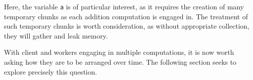 Here, the variable \texttt{a} is of particular interest, as it requires
the creation of many temporary chunks as each addition computation is
engaged in. The treatment of such temporary chunks is worth
consideration, as without appropriate collection, they will gather and
leak memory.

With client and workers engaging in multiple computations, it is now
worth asking how they are to be arranged over time. The following
section seeks to explore precisely this question.